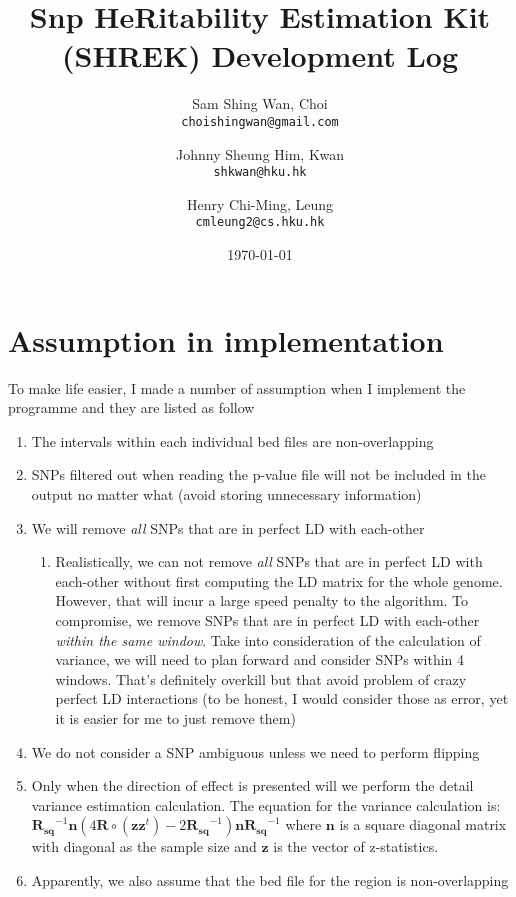 \documentclass[12pt]{article}
\title{Snp HeRitability Estimation Kit (SHREK) Development Log}
\date{\today}
\author{Sam Shing Wan, Choi\\ 
	\texttt{choishingwan@gmail.com}
	\and
	Johnny Sheung Him, Kwan\\
	\texttt{shkwan@hku.hk}
	\and
	Henry Chi-Ming, Leung\\
	\texttt{cmleung2@cs.hku.hk}
}
\begin{document}
	
	\maketitle
	\tableofcontents
	\newpage
	\section{Assumption in implementation}
	To make life easier, I made a number of assumption when I implement the programme and they are listed as follow
	\begin{enumerate}
		\item The intervals within each individual bed files are non-overlapping
		\item SNPs filtered out when reading the p-value file will not be included in the output no matter what (avoid storing unnecessary information)
		\item We will remove \emph{all} SNPs that are in perfect LD with each-other
		\begin{enumerate}
			\item Realistically, we can not remove \emph{all} SNPs that are in perfect LD with each-other without first computing the LD matrix for the whole genome. 
			However, that will incur a large speed penalty to the algorithm.
			To compromise, we remove SNPs that are in perfect LD with each-other \emph{within the same window}.
			Take into consideration of the calculation of variance, we will need to plan forward and consider SNPs within 4 windows. 
			That's definitely overkill but that avoid problem of crazy perfect LD interactions (to be honest, I would consider those as error, yet it is easier for me to just remove them)
		\end{enumerate}
		\item We do not consider a SNP ambiguous unless we need to perform flipping
		\item Only when the direction of effect is presented will we perform the detail variance estimation calculation.
		The equation for the variance calculation is:
		\begin{math}
			\boldsymbol{R_{sq}}^{-1}\boldsymbol{n}(4\boldsymbol{R}\circ(\boldsymbol{zz}^t)-2\boldsymbol{R_{sq}}^{-1})\boldsymbol{n}\boldsymbol{R_{sq}}^{-1}
		\end{math}
		where $\boldsymbol{n}$ is a square diagonal matrix with diagonal as the sample size and $\boldsymbol{z}$ is the vector of z-statistics.
		\item Apparently, we also assume that the bed file for the region is non-overlapping
	\end{enumerate}
	
\end{document}
